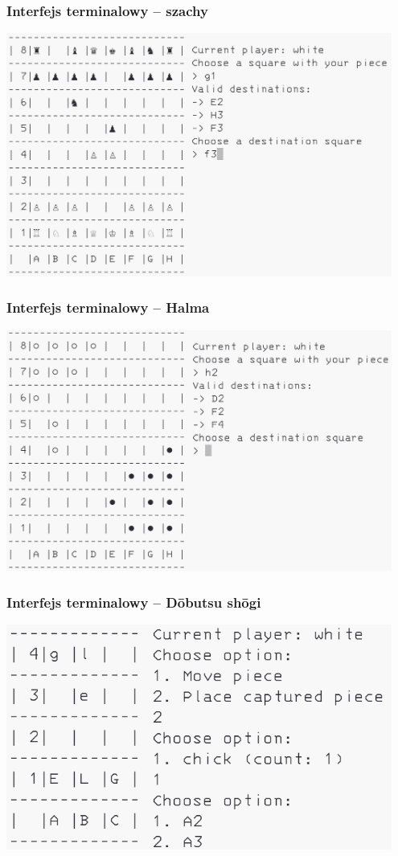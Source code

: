 \documentclass{beamer}
\begin{document}
\begin{frame}
	\frametitle{Interfejs terminalowy -- szachy}
	\centering
	\includegraphics[width=0.95\textwidth]{chess-terminal.png}
\end{frame}

\begin{frame}
	\frametitle{Interfejs terminalowy -- Halma}
	\centering
	\includegraphics[width=0.95\textwidth]{halma-terminal.png}
\end{frame}

\begin{frame}
	\frametitle{Interfejs terminalowy -- Dōbutsu shōgi}
	\centering
	\includegraphics[width=0.95\textwidth]{dobutsu-shogi-terminal.png}
\end{frame}
\end{document}
